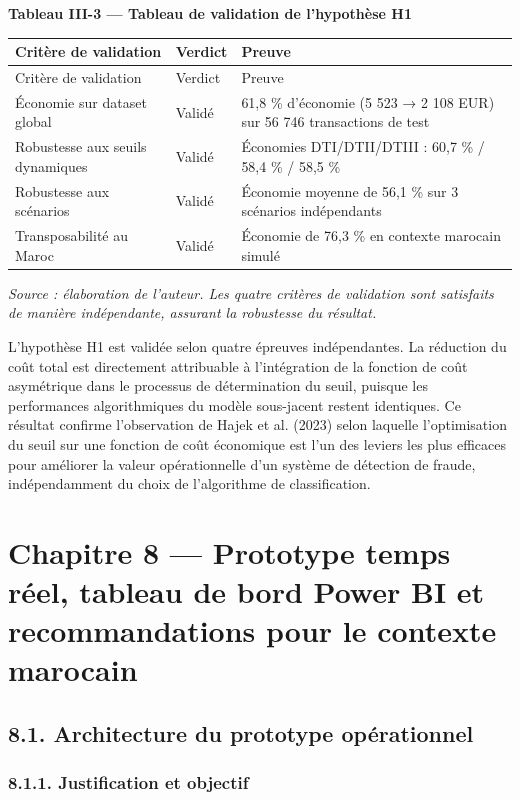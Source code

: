 \textbf{Tableau III-3 — Tableau de validation de l'hypothèse H1}

\begin{longtable}{|p{}|p{}|p{}|}
\hline
Critère de validation & Verdict & Preuve \\
\hline
\endfirsthead
\hline
Critère de validation & Verdict & Preuve \\
\hline
\endhead
Économie sur dataset global & Validé & 61,8 \% d'économie (5 523 → 2 108 EUR) sur 56 746 transactions de test \\
\hline
Robustesse aux seuils dynamiques & Validé & Économies DTI/DTII/DTIII : 60,7 \% / 58,4 \% / 58,5 \% \\
\hline
Robustesse aux scénarios & Validé & Économie moyenne de 56,1 \% sur 3 scénarios indépendants \\
\hline
Transposabilité au Maroc & Validé & Économie de 76,3 \% en contexte marocain simulé \\
\hline
\end{longtable}

\emph{Source : élaboration de l'auteur. Les quatre critères de validation sont satisfaits de manière indépendante, assurant la robustesse du résultat.}

L'hypothèse H1 est validée selon quatre épreuves indépendantes. La réduction du coût total est directement attribuable à l'intégration de la fonction de coût asymétrique dans le processus de détermination du seuil, puisque les performances algorithmiques du modèle sous-jacent restent identiques. Ce résultat confirme l'observation de Hajek et al. (2023) selon laquelle l'optimisation du seuil sur une fonction de coût économique est l'un des leviers les plus efficaces pour améliorer la valeur opérationnelle d'un système de détection de fraude, indépendamment du choix de l'algorithme de classification.

\chapter{Chapitre 8 — Prototype temps réel, tableau de bord Power BI et recommandations pour le contexte marocain}

\section{8.1. Architecture du prototype opérationnel}

\subsection{8.1.1. Justification et objectif}

